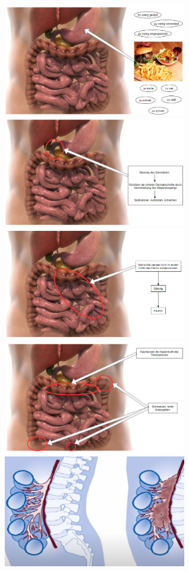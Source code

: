 \documentclass[xcolor=dvipsnames]{beamer}
\begin{document}
\begin{frame}[allowframebreaks]
        \begin{figure}
            \includegraphics[width=8cm]{../images/vergiftung_1.png}
            \includegraphics[width=8cm]{../images/vergiftung_2.png}
            \includegraphics[width=8cm]{../images/vergiftung_3.png}
            \includegraphics[width=8cm]{../images/vergiftung_4.png}
            \includegraphics[width=8cm]{../images/lymphe.png}
        \end{figure}
    \end{frame}
\end{document}
